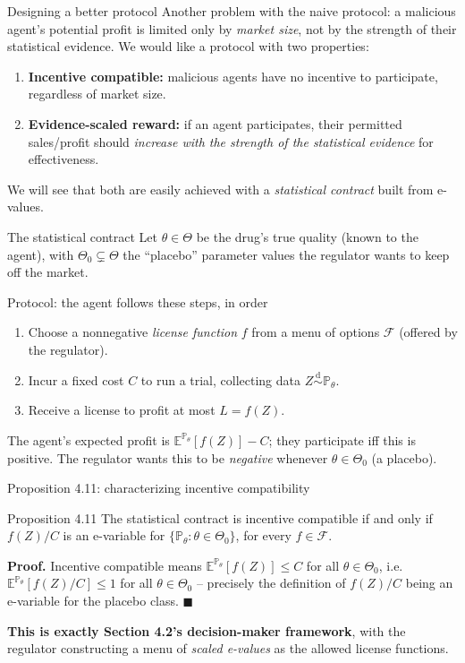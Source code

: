 \documentclass[aspectratio=169,10pt]{beamer}
\begin{document}
\begin{frame}{Designing a better protocol}
  Another problem with the naive protocol: a malicious agent's potential
  profit is limited only by \emph{market size}, not by the strength of their
  statistical evidence. We would like a protocol with two properties:
  \begin{enumerate}
    \item \textbf{Incentive compatible:} malicious agents have no incentive
    to participate, regardless of market size.
    \item \textbf{Evidence-scaled reward:} if an agent participates, their
    permitted sales/profit should \emph{increase with the strength of the
    statistical evidence} for effectiveness.
  \end{enumerate}
  We will see that both are easily achieved with a \emph{statistical
  contract} built from e-values.
\end{frame}

\begin{frame}{The statistical contract}
  Let $\theta\in\Theta$ be the drug's true quality (known to the agent),
  with $\Theta_0\subsetneq\Theta$ the ``placebo'' parameter values the
  regulator wants to keep off the market.

  \begin{block}{Protocol: the agent follows these steps, in order}
    \begin{enumerate}
      \item Choose a nonnegative \emph{license function} $f$ from a menu of
      options $\mathcal F$ (offered by the regulator).
      \item Incur a fixed cost $C$ to run a trial, collecting data
      $Z\overset{\mathrm d}{\sim}\mathbb P_\theta$.
      \item Receive a license to profit at most $L=f(Z)$.
    \end{enumerate}
  \end{block}
  The agent's expected profit is $\mathbb E^{\mathbb P_\theta}[f(Z)]-C$; they
  participate iff this is positive. The regulator wants this to be
  \emph{negative} whenever $\theta\in\Theta_0$ (a placebo).
\end{frame}

\begin{frame}{Proposition 4.11: characterizing incentive compatibility}
  \begin{block}{Proposition 4.11}
    The statistical contract is incentive compatible if and only if
    $f(Z)/C$ is an e-variable for $\{\mathbb P_\theta:\theta\in\Theta_0\}$,
    for every $f\in\mathcal F$.
  \end{block}
  \textbf{Proof.} Incentive compatible means
  $\mathbb E^{\mathbb P_\theta}[f(Z)]\le C$ for all $\theta\in\Theta_0$,
  i.e.\ $\mathbb E^{\mathbb P_\theta}[f(Z)/C]\le 1$ for all
  $\theta\in\Theta_0$ -- precisely the definition of $f(Z)/C$ being an
  e-variable for the placebo class. $\blacksquare$

  \medskip
  \textbf{This is exactly Section 4.2's decision-maker framework}, with the
  regulator constructing a menu of \emph{scaled e-values} as the allowed
  license functions.
\end{frame}
\end{document}
